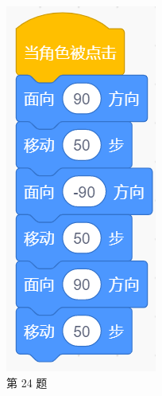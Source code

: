 \documentclass[10pt, a4paper]{article}
\begin{document}
\begin{enumerate}
\begin{figure}[htbp]
\begin{minipage}[t]{.1\textwidth}
                \includegraphics[width=\textwidth]{24-2.png}
                \caption*{第 24 题}
            \end{minipage}
        \end{figure}


\end{enumerate}
\end{document}
